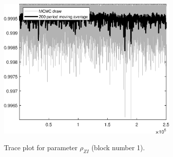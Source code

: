 \begin{figure}[H]
\centering
  \includegraphics[width=0.8\textwidth]{BRS_imp_mobility_alt/graphs/TracePlot_rho_ZI_blck_1}\\
    \caption{Trace plot for parameter ${\rho_{ZI}}$ (block number 1).}
\end{figure}
